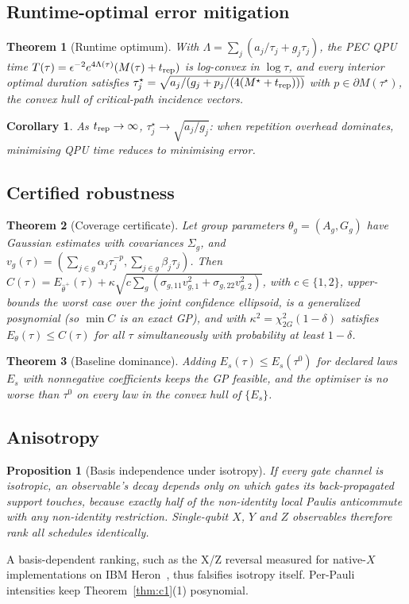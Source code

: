 \documentclass[10pt,journal]{IEEEtran}
\newtheorem{theorem}{Theorem}
\newtheorem{proposition}{Proposition}
\newtheorem{corollary}{Corollary}
\theoremstyle{remark}
\begin{document}
\subsection{Runtime-optimal error mitigation}
\begin{theorem}[Runtime optimum]\label{thm:c3}
With $\Lambda=\sum_j(a_j/\tau_j+g_j\tau_j)$, the PEC QPU time
$T(\tau)=\epsilon^{-2}e^{4\Lambda(\tau)}(M(\tau)+t_{\rm rep})$ is log-convex in $\log\tau$, and every interior
optimal duration satisfies $\tau_j^\star=\sqrt{a_j/(g_j+p_j/(4(M^\star+t_{\rm rep})))}$ with
$p\in\partial M(\tau^\star)$, the convex hull of critical-path incidence vectors.
\end{theorem}
\begin{corollary}\label{cor:trep}
As $t_{\rm rep}\to\infty$, $\tau_j^\star\to\sqrt{a_j/g_j}$: when repetition overhead dominates, minimising QPU
time reduces to minimising error.
\end{corollary}

\subsection{Certified robustness}
\begin{theorem}[Coverage certificate]\label{thm:c4}
Let group parameters $\theta_g=(A_g,G_g)$ have Gaussian estimates with covariances $\Sigma_g$, and
$v_g(\tau)=(\sum_{j\in g}\alpha_j\tau_j^{-p},\sum_{j\in g}\beta_j\tau_j)$. Then
$C(\tau)=E_{\hat\theta^+}(\tau)+\kappa\sqrt{c\sum_g(\sigma_{g,11}v_{g,1}^2+\sigma_{g,22}v_{g,2}^2)}$, with
$c\in\{1,2\}$, upper-bounds the worst case over the joint confidence ellipsoid, is a generalized posynomial
(so $\min C$ is an exact GP), and with $\kappa^2=\chi^2_{2G}(1-\delta)$ satisfies $E_\theta(\tau)\le C(\tau)$
for all $\tau$ simultaneously with probability at least $1-\delta$.
\end{theorem}
\begin{theorem}[Baseline dominance]\label{thm:dom}
Adding $E_s(\tau)\le E_s(\tau^0)$ for declared laws $E_s$ with nonnegative coefficients keeps the GP feasible,
and the optimiser is no worse than $\tau^0$ on every law in the convex hull of $\{E_s\}$.
\end{theorem}

\subsection{Anisotropy}
\begin{proposition}[Basis independence under isotropy]\label{prop:iso}
If every gate channel is isotropic, an observable's decay depends only on which gates its back-propagated
support touches, because exactly half of the non-identity local Paulis anticommute with any non-identity
restriction. Single-qubit $X$, $Y$ and $Z$ observables therefore rank all schedules identically.
\end{proposition}
A basis-dependent ranking, such as the X/Z reversal measured for native-$X$ implementations on IBM
Heron~\cite{ramadan2026}, thus falsifies isotropy itself. Per-Pauli intensities keep Theorem~\ref{thm:c1}(1)
posynomial.
\end{document}
